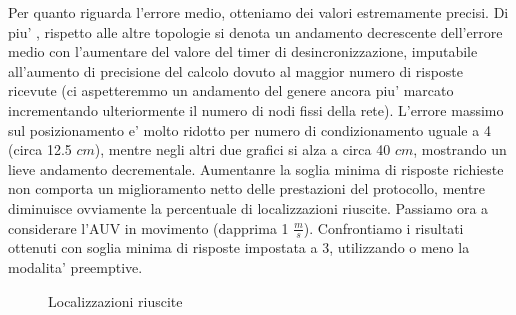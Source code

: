 \documentclass[Lau,binding=0.6cm]{sapthesis}
\begin{document}
Per quanto riguarda l'errore medio, otteniamo dei valori estremamente precisi. Di piu' , rispetto alle altre topologie si denota un andamento decrescente dell'errore medio con l'aumentare del valore del timer di desincronizzazione, imputabile all'aumento di precisione del calcolo dovuto al maggior numero di risposte ricevute (ci aspetteremmo un andamento del genere ancora piu' marcato incrementando ulteriormente il numero di nodi fissi della rete).
L'errore massimo sul posizionamento e' molto ridotto per numero di condizionamento uguale a 4 (circa 12.5 $cm$), mentre negli altri due grafici si alza a circa 40 $cm$, mostrando un lieve andamento decrementale.
Aumentanre la soglia minima di risposte richieste non comporta un miglioramento netto delle prestazioni del protocollo, mentre diminuisce ovviamente la percentuale di localizzazioni riuscite.
Passiamo ora a considerare l'AUV in movimento (dapprima 1 $\frac{m}{s}$).
Confrontiamo i risultati ottenuti con soglia minima di risposte impostata a 3, utilizzando o meno la modalita' preemptive.
\begin{figure}[H]
    \centering
    \hfill
    \caption{Localizzazioni riuscite}
\end{figure}
\end{document}
